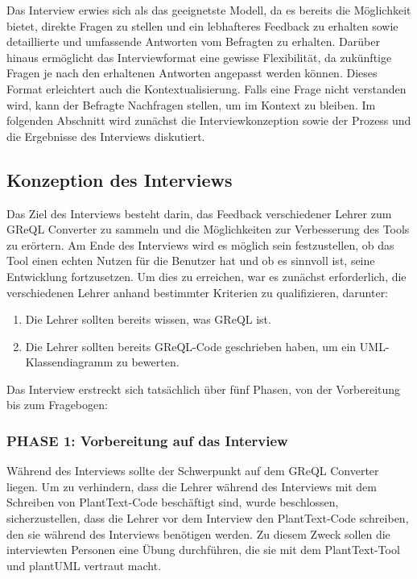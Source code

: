 Das Interview erwies sich als das geeignetste Modell, da es bereits die Möglichkeit bietet, direkte Fragen zu stellen
und ein lebhafteres Feedback zu erhalten sowie detaillierte und umfassende Antworten vom Befragten zu erhalten. Darüber
hinaus ermöglicht das Interviewformat eine gewisse Flexibilität, da zukünftige Fragen je nach den erhaltenen Antworten
angepasst werden können. Dieses Format erleichtert auch die Kontextualisierung. Falls eine Frage nicht verstanden wird,
kann der Befragte Nachfragen stellen, um im Kontext zu bleiben. Im folgenden Abschnitt wird zunächst die
Interviewkonzeption sowie der Prozess und die Ergebnisse des Interviews diskutiert.

\subsection{Konzeption des Interviews}

Das Ziel des Interviews besteht darin, das Feedback verschiedener Lehrer zum GReQL Converter zu sammeln und die
Möglichkeiten zur Verbesserung des Tools zu erörtern. Am Ende des Interviews wird es möglich sein festzustellen, ob
das Tool einen echten Nutzen für die Benutzer hat und ob es sinnvoll ist, seine Entwicklung fortzusetzen. Um dies zu
erreichen, war es zunächst erforderlich, die verschiedenen Lehrer anhand bestimmter Kriterien zu qualifizieren,
darunter:

\begin{enumerate}
    \item Die Lehrer sollten bereits wissen, was GReQL ist.
    \item Die Lehrer sollten bereits GReQL-Code geschrieben haben, um ein UML-Klassendiagramm zu bewerten.
\end{enumerate}

Das Interview erstreckt sich tatsächlich über fünf Phasen, von der Vorbereitung bis zum Fragebogen:

\subsubsection{PHASE 1: Vorbereitung auf das Interview}

Während des Interviews sollte der Schwerpunkt auf dem GReQL Converter liegen. Um zu verhindern, dass die Lehrer
während des Interviews mit dem Schreiben von PlantText-Code beschäftigt sind, wurde beschlossen, sicherzustellen,
dass die Lehrer vor dem Interview den PlantText-Code schreiben, den sie während des Interviews benötigen werden. Zu
diesem Zweck sollen die interviewten Personen eine Übung durchführen, die sie mit dem PlantText-Tool und plantUML
vertraut macht.

